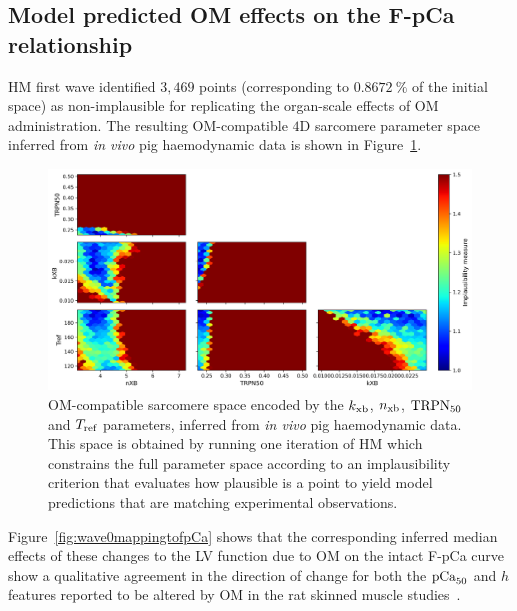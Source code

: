 %
%
%
\subsection{Model predicted OM effects on the F-pCa relationship}\label{sec:ch5inferringomeffectsfpcawholeorganresults}
HM first wave identified $3,469$ points (corresponding to $\SI{0.8672}{\percent}$ of the initial space) as non-implausible for replicating the organ-scale effects of OM administration. The resulting OM-compatible $4$D sarcomere parameter space inferred from \textit{in vivo} pig haemodynamic data is shown in Figure~\ref{fig:wave0}. 

\begin{figure}[!ht]
    \myfloatalign
    \includegraphics[width=\textwidth]{figures/chapter05/Fig1.png}
    \caption{OM-compatible sarcomere space encoded by the $k_{\textrm{xb}}$, $n_{\textrm{xb}}$, $\textrm{TRPN}_{50}$ and $T_{\textrm{ref}}$ parameters, inferred from \textit{in vivo} pig haemodynamic data. This space is obtained by running one iteration of HM which constrains the full parameter space according to an implausibility criterion that evaluates how plausible is a point to yield model predictions that are matching experimental observations.}
    \label{fig:wave0}
\end{figure}

\vspace{0.2cm}
Figure~\ref{fig:wave0mappingtofpCa} shows that the corresponding inferred median effects of these changes to the LV function due to OM on the intact F-pCa curve show a qualitative agreement in the direction of change for both the $\textrm{pCa}_{50}$ and $h$ features reported to be altered by OM in the rat skinned muscle studies~\cite{Nagy:2015, Kampourakis:2018, Kieu:2019}.

